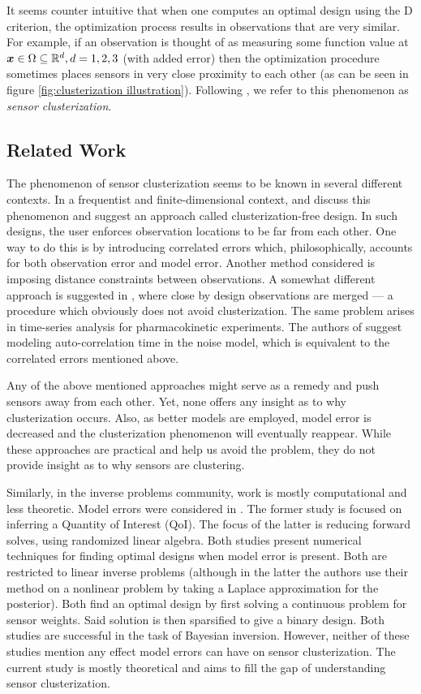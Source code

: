 It seems counter intuitive that when one computes an optimal design
using the D criterion, the optimization process results in
observations that are very similar. For example, if an observation is
thought of as measuring some function value at ${\boldsymbol{x}} \in \Omega
\subseteq \mathbb{R}^d, d=1,2,3$ (with added error) then the optimization
procedure sometimes places sensors in very close proximity to each
other (as can be seen in figure \ref{fig:clusterization
  illustration}). Following \cite{Ucinski05}, we refer to this
phenomenon as \emph{sensor clusterization}.

\subsection{Related Work}
The phenomenon of sensor clusterization seems to be known in several
different contexts. In a frequentist and finite-dimensional context,
\cite{fedorov1996} and \cite[chapter 2.4.3]{Ucinski05} discuss this
phenomenon and suggest an approach called clusterization-free design.
In such designs, the user enforces observation locations to be far
from each other. One way to do this is by introducing correlated
errors which, philosophically, accounts for both observation error and
model error. Another method considered is imposing distance
constraints between observations. A somewhat different approach is
suggested in \cite[page 49]{fedorov2012}, where close by design
observations are merged --- a procedure which obviously does not avoid
clusterization. The same problem arises in time-series analysis for
pharmacokinetic experiments. The authors of \cite{hooker2009} suggest
modeling auto-correlation time in the noise model, which is equivalent
to the correlated errors mentioned above.

Any of the above mentioned approaches might serve as a remedy and push
sensors away from each other. Yet, none offers any insight as to why
clusterization occurs. Also, as better models are employed, model
error is decreased and the clusterization phenomenon will eventually
reappear. While these approaches are practical and help us avoid the
problem, they do not provide insight as to why sensors are clustering.

Similarly, in the inverse problems community, work is mostly
computational and less theoretic. Model errors were considered in
\cite{attia2020, koval2020}. The former study is focused on inferring a
Quantity of Interest (QoI). The focus of the latter is reducing
forward solves, using randomized linear algebra. Both studies present
numerical techniques for finding optimal designs when model error is
present. Both are restricted to linear inverse problems (although in
the latter the authors use their method on a nonlinear problem by
taking a Laplace approximation for the posterior). Both find an
optimal design by first solving a continuous problem for sensor
weights. Said solution is then sparsified to give a binary
design. Both studies are successful in the task of Bayesian
inversion. However, neither of these studies mention any effect model
errors can have on sensor clusterization. The current study is mostly
theoretical and aims to fill the gap of understanding sensor
clusterization.


